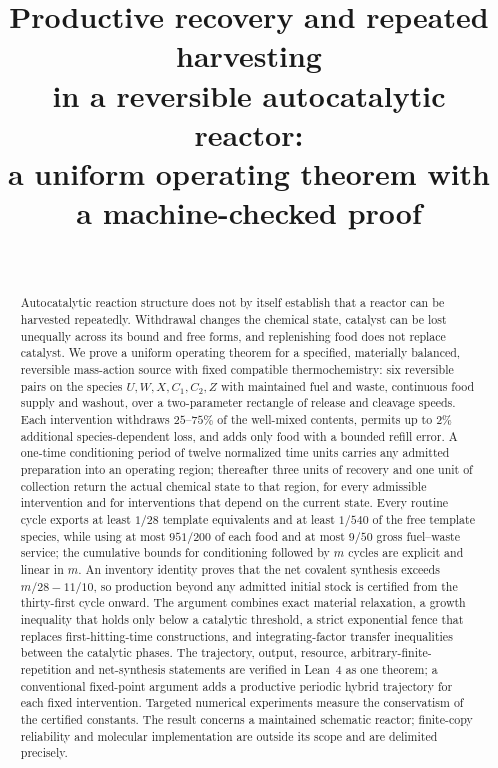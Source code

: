 \documentclass[11pt,a4paper]{article}
\title{Productive recovery and repeated harvesting\\ in a reversible autocatalytic reactor:\\[4pt]
\large a uniform operating theorem with a machine-checked proof}
\author{\PaperAuthor\\ \small \PaperAffiliation}
\date{\PaperDate}
\theoremstyle{plain}
\theoremstyle{definition}
\theoremstyle{remark}
\begin{document}
\maketitle

\begin{abstract}
Autocatalytic reaction structure does not by itself establish that a reactor can be harvested repeatedly. Withdrawal changes the chemical state, catalyst can be lost unequally across its bound and free forms, and replenishing food does not replace catalyst. We prove a uniform operating theorem for a specified, materially balanced, reversible mass-action source with fixed compatible thermochemistry: six reversible pairs on the species $U,W,X,C_1,C_2,Z$ with maintained fuel and waste, continuous food supply and washout, over a two-parameter rectangle of release and cleavage speeds. Each intervention withdraws $25$--$75\%$ of the well-mixed contents, permits up to $2\%$ additional species-dependent loss, and adds only food with a bounded refill error. A one-time conditioning period of twelve normalized time units carries any admitted preparation into an operating region; thereafter three units of recovery and one unit of collection return the actual chemical state to that region, for every admissible intervention and for interventions that depend on the current state. Every routine cycle exports at least $1/28$ template equivalents and at least $1/540$ of the free template species, while using at most $951/200$ of each food and at most $9/50$ gross fuel--waste service; the cumulative bounds for conditioning followed by $m$ cycles are explicit and linear in $m$. An inventory identity proves that the net covalent synthesis exceeds $m/28-11/10$, so production beyond any admitted initial stock is certified from the thirty-first cycle onward. The argument combines exact material relaxation, a growth inequality that holds only below a catalytic threshold, a strict exponential fence that replaces first-hitting-time constructions, and integrating-factor transfer inequalities between the catalytic phases. The trajectory, output, resource, arbitrary-finite-repetition and net-synthesis statements are verified in Lean~4 as one theorem; a conventional fixed-point argument adds a productive periodic hybrid trajectory for each fixed intervention. Targeted numerical experiments measure the conservatism of the certified constants. The result concerns a maintained schematic reactor; finite-copy reliability and molecular implementation are outside its scope and are delimited precisely.
\end{abstract}
\end{document}
